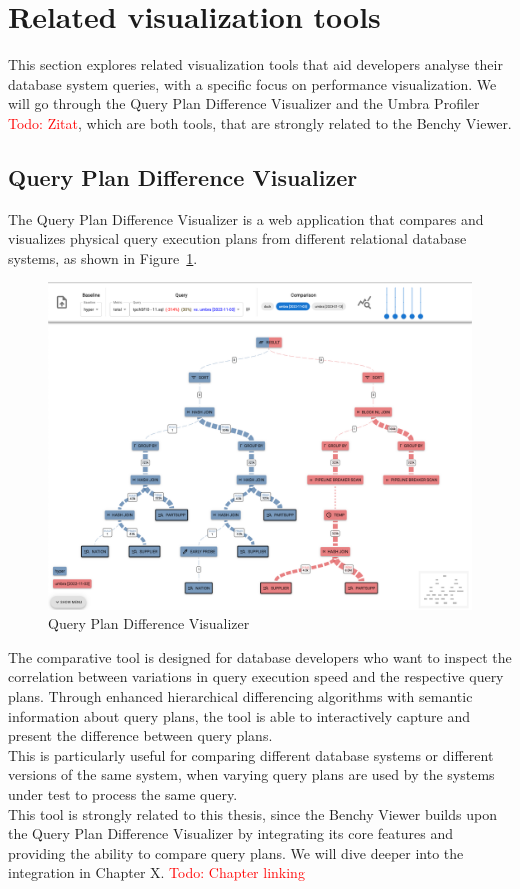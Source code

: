 \section{Related visualization tools}

This section explores related visualization tools that aid developers analyse their database system queries, with a specific focus on performance visualization. We will go through the Query Plan Difference Visualizer and the Umbra Profiler \textcolor{red}{Todo: Zitat}, which are both tools, that are strongly related to the Benchy Viewer. 


\subsection{Query Plan Difference Visualizer}
\label{subsec:semantic-diff}

The Query Plan Difference Visualizer is a web application that compares and visualizes physical query execution plans from different relational database systems, as shown in Figure~\ref{fig:semantic-diff}.
\begin{figure}[h]
    \centering
    \includegraphics[width=0.8\linewidth]{figures/semantic-diff.png}
    \caption{Query Plan Difference Visualizer}
    \label{fig:semantic-diff}
  \end{figure}

\noindent The comparative tool is designed for database developers who want to inspect the correlation between variations in query execution speed and the respective query plans. Through enhanced hierarchical differencing algorithms with semantic information about query plans, the tool is able to interactively capture and present  the difference between query plans.
\\This is particularly useful for comparing different database systems or different versions of the same system, when varying query plans are used by the systems under test to process the same query.
\\This tool is strongly related to this thesis, since the Benchy Viewer builds upon the Query Plan Difference Visualizer by integrating its core features and providing the ability to compare query plans. We will dive deeper into the integration in Chapter X. \textcolor{red}{Todo: Chapter linking}



